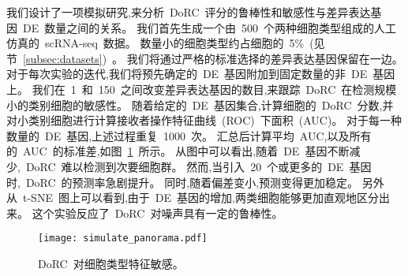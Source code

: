
我们设计了一项模拟研究,来分析~DoRC~评分的鲁棒性和敏感性与差异表达基因~DE~数量之间的关系。
我们首先生成一个由~500~个两种细胞类型组成的人工仿真的~scRNA-seq~数据。
数量小的细胞类型约占细胞的~5\%~(见节~\ref{subsec:datasets})~。
我们将通过严格的标准选择的差异表达基因保留在一边。
对于每次实验的迭代,我们将预先确定的~DE~基因附加到固定数量的非~DE~基因上。
我们在~1~和~150~之间改变差异表达基因的数目,来跟踪~DoRC~在检测规模小的类别细胞的敏感性。
随着给定的~DE~基因集合,计算细胞的~DoRC~分数,并对小类别细胞进行计算接收者操作特征曲线~(ROC)~下面积~(AUC)。
对于每一种数量的~DE~基因,上述过程重复~1000~次。
汇总后计算平均~AUC,以及所有的~AUC~的标准差,如图~\ref{fig:simulate:roc}~所示。
从图中可以看出,随着~DE~基因不断减少,~DoRC~难以检测到次要细胞群。
然而,当引入~20~个或更多的~DE~基因时,~DoRC~的预测率急剧提升。
同时,随着偏差变小,预测变得更加稳定。
另外从~t-SNE~图上可以看到,由于~DE~基因的增加,两类细胞能够更加直观地区分出来。
这个实验反应了~DoRC~对噪声具有一定的鲁棒性。

\begin{figure}[!htbp]
    \centering
    \texttt{[image: simulate\_panorama.pdf]}
    \caption{
    DoRC~对细胞类型特征敏感。
    }
    \label{fig:simulate:roc}
\end{figure}

